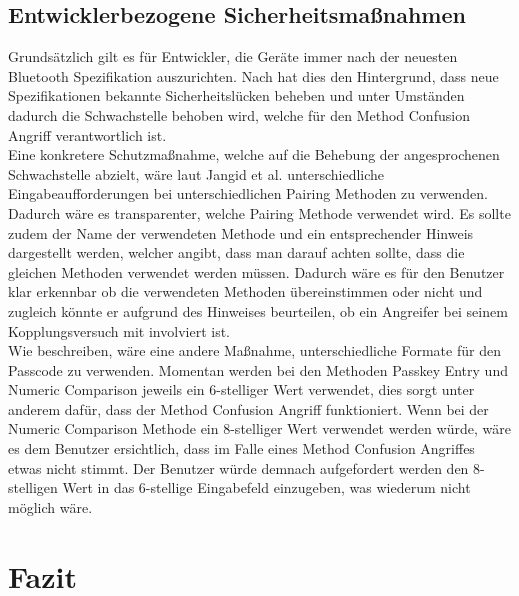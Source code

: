 \documentclass[
    a4paper,
    pagesize,
    pdftex,
    12pt,
]{scrartcl}
\begin{document}
\subsection{Entwicklerbezogene Sicherheitsmaßnahmen}
    Grundsätzlich gilt es für Entwickler, die Geräte immer nach der neuesten Bluetooth Spezifikation auszurichten. Nach \cite{bluetooth_newest_security_risks} hat dies den Hintergrund, dass neue Spezifikationen bekannte Sicherheitslücken beheben und unter Umständen dadurch die Schwachstelle behoben wird, welche für den Method Confusion Angriff verantwortlich ist. \\
    Eine konkretere Schutzmaßnahme, welche auf die Behebung der angesprochenen Schwachstelle abzielt, wäre laut Jangid et al. \cite{bluetooth_formal_analysis} unterschiedliche Eingabeaufforderungen bei unterschiedlichen Pairing Methoden zu verwenden. Dadurch wäre es transparenter, welche Pairing Methode verwendet wird. Es sollte zudem der Name der verwendeten Methode und ein entsprechender Hinweis dargestellt werden, welcher angibt, dass man darauf achten sollte, dass die gleichen Methoden verwendet werden müssen. Dadurch wäre es für den Benutzer klar erkennbar ob die verwendeten Methoden übereinstimmen oder nicht und zugleich könnte er aufgrund des Hinweises beurteilen, ob ein Angreifer bei seinem Kopplungsversuch mit involviert ist. \\
    Wie \cite{bluetooth_formal_analysis} beschreiben, wäre eine andere Maßnahme, unterschiedliche Formate für den Passcode zu verwenden. Momentan werden bei den Methoden Passkey Entry und Numeric Comparison jeweils ein 6-stelliger Wert verwendet, dies sorgt unter anderem dafür, dass der Method Confusion Angriff funktioniert. Wenn bei der Numeric Comparison Methode ein 8-stelliger Wert verwendet werden würde, wäre es dem Benutzer ersichtlich, dass im Falle eines Method Confusion Angriffes etwas nicht stimmt. Der Benutzer würde demnach aufgefordert werden den 8-stelligen Wert in das 6-stellige Eingabefeld einzugeben, was wiederum nicht möglich wäre.
    
    \newpage
\section{Fazit}

    \newpage

    
    
\end{document}
